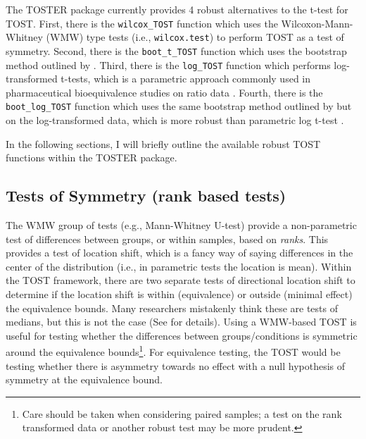 \documentclass[]{interact}
\theoremstyle{plain}%
\theoremstyle{definition}
\theoremstyle{remark}
\begin{document}
The TOSTER package currently provides 4 robust alternatives to the
t-test for TOST. First, there is the \texttt{wilcox\_TOST} function
which uses the Wilcoxon-Mann-Whitney (WMW) type tests (i.e.,
\texttt{wilcox.test}) to perform TOST as a test of symmetry. Second,
there is the \texttt{boot\_t\_TOST} function which uses the bootstrap
method outlined by \citet{efron93}. Third, there is the
\texttt{log\_TOST} function which performs log-transformed t-tests,
which is a parametric approach commonly used in pharmaceutical
bioequivalence studies on ratio data \citep{he2022}. Fourth, there is
the \texttt{boot\_log\_TOST} function which uses the same bootstrap
method outlined by \citet{efron93} but on the log-transformed data,
which is more robust than parametric log t-test \citep{he2022}.

In the following sections, I will briefly outline the available robust
TOST functions within the TOSTER package.

\hypertarget{tests-of-symmetry-rank-based-tests}{%
\subsection{Tests of Symmetry (rank based
tests)}\label{tests-of-symmetry-rank-based-tests}}

The WMW group of tests (e.g., Mann-Whitney U-test) provide a
non-parametric test of differences between groups, or within samples,
based on \emph{ranks}. This provides a test of location shift, which is
a fancy way of saying differences in the center of the distribution
(i.e., in parametric tests the location is mean). Within the TOST
framework, there are two separate tests of directional location shift to
determine if the location shift is within (equivalence) or outside
(minimal effect) the equivalence bounds. Many researchers mistakenly
think these are tests of medians, but this is not the case (See
\citet{median_test} for details). Using a WMW-based TOST is useful for
testing whether the differences between groups/conditions is symmetric
around the equivalence bounds\footnote{Care should be taken when
  considering paired samples; a test on the rank transformed data
  \citep{kornbrot1990rank} or another robust test may be more prudent.}.
For equivalence testing, the TOST would be testing whether there is
asymmetry towards no effect with a null hypothesis of symmetry at the
equivalence bound.
\end{document}
